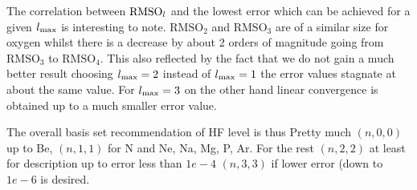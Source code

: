The correlation between $\text{RMSO}_l$ and the lowest error which can be
achieved for a given $l_\text{max}$ is interesting to note.
$\text{RMSO}_2$ and $\text{RMSO}_3$ are of a similar size for oxygen
whilst there is a decrease by about 2 orders of magnitude going
from $\text{RMSO}_3$ to $\text{RMSO}_4$.
This also reflected by the fact that we do not gain a much better
result choosing $l_\text{max} = 2$ instead of $l_\text{max} = 1$
the error values stagnate at about the same value.
For $l_\text{max} = 3$ on the other hand linear convergence is obtained
up to a much smaller error value.


The overall basis set recommendation of HF level is thus
Pretty much $(n, 0, 0)$ up to Be, $(n, 1, 1)$ for N and Ne, Na, Mg, P, Ar.
For the rest $(n, 2, 2)$ at least for description up to error less than $1e-4$
$(n, 3, 3)$ if lower error (down to $1e-6$ is desired.


%

%

